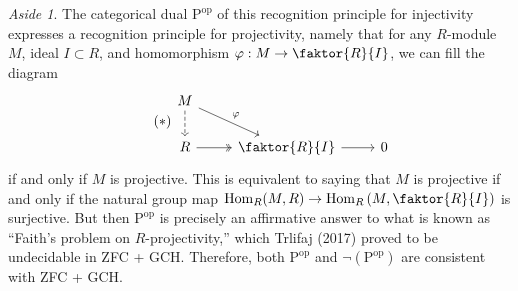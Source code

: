 \documentclass[10pt,letterpaper,cm]{nupset}
\theoremstyle{definition}
\theoremstyle{theorem}
\theoremstyle{remark}
\newtheorem*{aside}{Aside}
\newcommand{\1}{\mathbf{1}}
\newcommand{\0}{\vec 0}
\newcommand{\Rho}{\mathrm{P}}
\DeclareMathOperator{\op}{op}
\DeclareMathOperator{\Hom}{Hom}
\begin{document}
\begin{aside}
The categorical dual $\Rho^{\op}$ of this recognition principle for injectivity expresses a recognition principle for projectivity, namely that for any $R$-module $M$, ideal $I\subset R$, and homomorphism $\varphi : M \to \faktor{R}{I}$, we can fill the diagram
\[ \tag{$\ast$}
\begin{tikzcd}
M \arrow[rd, "\varphi"] \arrow[d, dashed] &  &  \\
R \arrow[r, two heads] & \faktor{R}{I} \arrow[r] & 0
\end{tikzcd}
\] if and only if $M$ is projective. This is equivalent to saying that $M$ is projective if and only if the natural group map $\Hom_R(M, R) \to \Hom_R \left(M, \faktor{R}{I} \right)$ is surjective. 
But then $\Rho^{\op}$ is precisely an affirmative answer to what is known as ``Faith's problem on $R$-projectivity,'' which Trlifaj (2017) proved to be undecidable in ZFC + GCH. Therefore, both $\Rho^{\op}$ and $\neg (\Rho^{\op})$ are consistent with ZFC + GCH.
\end{aside}
\end{document}
